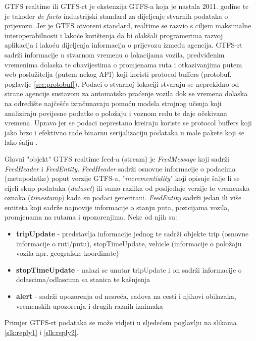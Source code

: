 \documentclass[zavrsnirad]{fer}
\begin{document}
GTFS realtime ili GTFS-rt je ekstenzija GTFS-a koja je nastala 2011. godine te je također \textit{de facto}
industrijski standard za dijeljenje stvarnih podataka o prijevozu. Jer je GTFS otvoreni standard,
realtime se razvio s ciljem maksimalne interoperabilnosti i lakoće korištenja da bi olakšali
programerima razvoj aplikacija i lakoću dijeljenja informacija o prijevozu između agencija. GTFS-rt
sadrži informacije u stvarnom vremenu o lokacijama vozila, predviđenim vremenima dolaska te
obavijestima o promjenama ruta i otkazivanjima putem web poslužitelja (putem nekog API) koji koristi protocol buffers (protobuf, poglavlje \ref{sec:protobuf}). Podaci o stvarnoj lokaciji stvaraju se neprekidno od strane agencije sustavom za automatsko praćenje vozila dok se vremena dolaska na odredište najčešće izračunavaju pomoću modela strojnog učenja koji analiziraju povijesne podatke o položaju i voznom redu te daje očekivana vremena. Upravo jer se podaci neprestano kreiraju koriste se protocol buffers koji jako brzo i efektivno rade binarnu serijalizaciju podataka u male pakete koji se lako šalju \cite{GTFS-realtime}.

Glavni "objekt" GTFS realtime feed-a (stream) je \textit{FeedMessage} koji sadrži \textit{FeedHeader} i \textit{FeedEntity}.
\textit{FeedHeader} sadrži osnovne informacije o podacima (metapodatke) poput verzije GTFS-a, "\textit{incrementiality}" koji opisuje šalje li se cijeli skup podataka (\textit{dataset}) ili samo razlika od posljednje verzije te vremenska oznaka (\textit{timestamp}) kada su podaci generirani.
\textit{FeedEntity} sadrži jedan ili više entiteta koji sadrže najnovije informacije o stanju puta, pozicijama vozila, promjenama na rutama i upozorenjima. Neke od njih su: 

\begin{itemize}
	\item \textbf{tripUpdate} - predstavlja informacije jednog te sadrži objekte trip (osnovne informacije o ruti/putu), stopTimeUpdate, vehicle (informacije o položaju vozila npr. geografske koordinate)
	\item \textbf{stopTimeUpdate} - nalazi se unutar tripUpdate i on sadrži informacije o dolascima/odlascima sa stanica te kašnjenja
	\item \textbf{alert} - sadrži upozorenja od nesreća, radova na cesti i njihovi obilazaka, vremenskih upozorenja i drugih raznih iznimaka
\end{itemize}

Primjer GTFS-rt podataka se može vidjeti u sljedećem poglavlju na slikama \ref{slk:reply1} i \ref{slk:reply2}.
\end{document}
